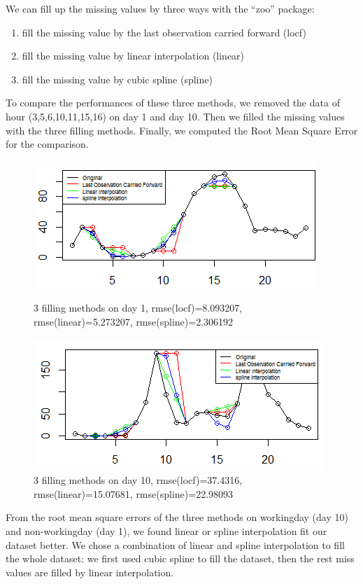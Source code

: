 \documentclass[12pt]{article}
\begin{document}
	We can fill up the missing values by three ways with the ``zoo'' package:
	\begin{enumerate}
		\item fill the missing value by the last observation carried forward (locf)
		
		\item fill the missing value by linear interpolation (linear)
		
		\item fill the missing value by cubic spline (spline)
	\end{enumerate}
	To compare the performances of these three methods, we removed the data of hour (3,5,6,10,11,15,16) on day 1 and day 10. Then we filled the missing values with the three filling methods. Finally, we computed the Root Mean Square Error for the comparison. 
	\begin{figure}[H]
		\centering
		\begin{minipage}{.45\textwidth}
			\centering
			\includegraphics[width=\linewidth]{figures/day1_missing_value.png}
			\caption{3 filling methods on day 1, rmse(locf)=8.093207, rmse(linear)=5.273207, rmse(spline)=2.306192}
		\end{minipage}%
		\begin{minipage}{.42\textwidth}
			\centering
			\includegraphics[width=\linewidth]{figures/day10_missing_value.png}
			\caption{ 3 filling methods on day 10, rmse(locf)=37.4316, rmse(linear)=15.07681, rmse(spline)=22.98093}
			
		\end{minipage}
	\end{figure}
 From the root mean square errors of the three methods on workingday (day 10) and non-workingday (day 1), we found linear or spline interpolation fit our dataset better. We chose a combination of linear and spline interpolation to fill the whole dataset: we first used cubic spline to fill the dataset, then the rest miss values are filled by linear interpolation.
\end{document}
